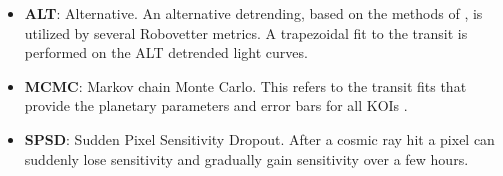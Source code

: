 \begin{itemize}
\item[] \textbf{ALT}: Alternative. An alternative detrending, based on the methods of \citet{Garcia2010}, is utilized by several Robovetter metrics. A trapezoidal fit to the transit is performed on the ALT detrended light curves.
\item[] \textbf{MCMC}: Markov chain Monte Carlo. This refers to the transit fits that provide the planetary parameters and error bars for all KOIs \citep{Hoffman2017}.
\item[] \textbf{SPSD}: Sudden Pixel Sensitivity Dropout.  After a cosmic ray hit a pixel can suddenly lose sensitivity and gradually gain sensitivity over a few hours.

\end{itemize}